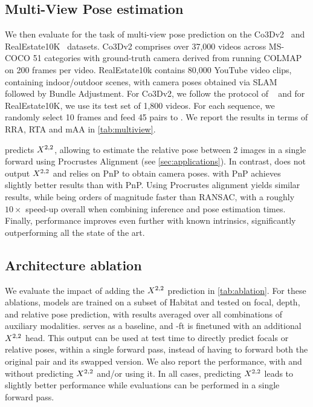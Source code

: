 \subsection{Multi-View Pose estimation}
\label{sec:pose}
\label{sec:xp_mvds}

We then evaluate \ours{} for the task of multi-view pose prediction on the Co3Dv2~\cite{reizenstein2021common} and RealEstate10K~\cite{realestate10K} datasets. 
Co3Dv2 comprises over 37,000 videos across MS-COCO 51 categories with ground-truth camera derived from running COLMAP on 200 frames per video.
RealEstate10k contains 80,000 YouTube video clips, containing indoor/outdoor scenes, with camera poses obtained via SLAM followed by Bundle Adjustment.
For Co3Dv2, we follow the protocol of ~\cite{wang2023posediffusion} and for RealEstate10K, we use its test set of 1,800 videos. 
For each sequence, we randomly select 10 frames and feed 45 pairs to \ours{}.
We report the results in terms of RRA, RTA and mAA in \cref{tab:multiview}.

 \ours{} predicts $X^{2,2}$, allowing to estimate the relative pose between 2 images in a single forward using Procrustes Alignment (see \cref{sec:applications}). %
In contrast, \duster{} does not output $X^{2,2}$ and relies on PnP to obtain camera poses.
\ours{} with PnP achieves slightly better results than \duster{} with PnP.
Using Procrustes alignment yields similar results, while being orders of magnitude faster than RANSAC, with a roughly $10\times$ speed-up overall when combining inference and pose estimation times.
Finally, performance improves even further with known intrinsics, significantly outperforming all the state of the art.




\subsection{Architecture ablation}
\label{sec:ablations}

We evaluate the impact of adding the $X^{2,2}$ prediction in \cref{tab:ablation}.
For these ablations, models are trained on a subset of Habitat and tested on focal, depth, and relative pose prediction, with results averaged over all combinations of auxiliary modalities.
\duster{} serves as a baseline, and \duster{}-ft is finetuned with an additional $X^{2,2}$ head.
This output can be used at test time to directly predict focals or relative poses, within a single forward pass, instead of having to forward both the original pair and its swapped version.
We also report the performance, with and without predicting $X^{2,2}$ and/or using it.
In all cases, predicting $X^{2,2}$ leads to slightly better performance while evaluations can be performed in a single forward pass.


